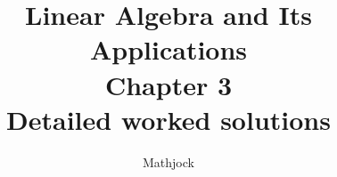 
\title{\textbf{Linear Algebra and Its Applications}\\[0.3em]Chapter 3\\[0.3em]\large Detailed worked solutions}
\author{Mathjock}
\date{}

\maketitle
\bookinfo
\tableofcontents
\clearpage
\renewcommand{\thesection}{3.\arabic{section}}
\renewcommand{\theHsection}{3.\arabic{section}}
\setcounter{section}{0}

\clearpage
\renewcommand{\thesection}{3.\arabic{section}}
\renewcommand{\theHsection}{3.\arabic{section}}
\setcounter{section}{1}

\clearpage
\renewcommand{\thesection}{3.\arabic{section}}
\renewcommand{\theHsection}{3.\arabic{section}}
\setcounter{section}{2}

\clearpage
\renewcommand{\thesection}{3.S}
\renewcommand{\theHsection}{3.S}
\setcounter{section}{0}


